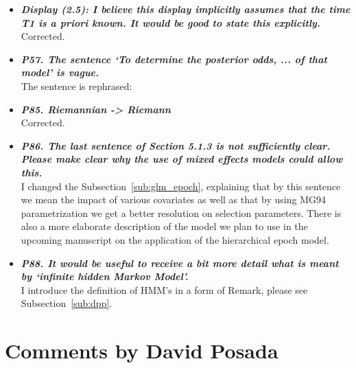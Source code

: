 \documentclass[english]{article}
\begin{document}
\begin{itemize}
\item {
{\it
\textbf{
Display (2.5): I believe this display implicitly assumes that the time T1 is a priori known. 
It would be good to state this explicitly.
}%
}%
}%
\\
Corrected.


\item {
{\it
\textbf{
P57. The sentence `To determine the posterior odds, ... of that model' is vague.
}%
}%
}%
\\
The sentence is rephrased:

\begin{quote}
\myeditsveighteen
\end{quote}


\item {
{\it
\textbf{
P85. Riemannian -> Riemann
}%
}%
}%
\\
Corrected.


\item {
{\it
\textbf{
P86. The last sentence of Section 5.1.3 is not sufficiently clear. 
Please make clear why the use of mixed effects models could allow this.
}%
}%
}%
\\
I changed the Subsection~\ref{sub:glm_epoch}, explaining that by this sentence we mean the impact of various covariates as well as that by using MG94 parametrization we get a better resolution on selection parameters.
There is also a more elaborate description of the model we plan to use in the upcoming manuscript on the application of the hierarchical epoch model.



\item {
{\it
\textbf{
P88. It would be useful to receive a bit more detail what is meant by `infinite hidden Markov Model'.
}%
}%
}%
\\
I introduce the definition of HMM's in a form of Remark, please see Subsection~\ref{sub:dpp}.



\end{itemize}


\section*{Comments by David Posada}
\end{document}
